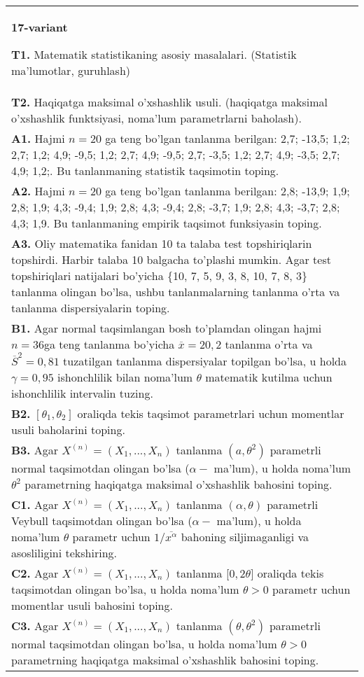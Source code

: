 \documentclass{article}
\begin{document}
\begin{tabular}{m{17cm}}
\textbf{17-variant}
\newline

\textbf{T1.} Matematik statistikaning asosiy masalalari. (Statistik ma'lumotlar, guruhlash)
\\
\textbf{T2.} 
Haqiqatga maksimal o'xshashlik usuli. (haqiqatga maksimal o'xshashlik funktsiyasi, noma'lum parametrlarni baholash).
\\
\textbf{A1.} 
Hajmi \(n = 20\) ga teng bo'lgan tanlanma berilgan: 2,7; -13,5; 1,2; 2,7; 1,2; 4,9; -9,5; 1,2; 2,7; 4,9; -9,5; 2,7; -3,5; 1,2; 2,7; 4,9; -3,5; 2,7; 4,9; 1,2;. Bu tanlanmaning statistik taqsimotin toping.
\\
\textbf{A2.} 
Hajmi \(n = 20\) ga teng bo'lgan tanlanma berilgan: 2,8; -13,9; 1,9; 2,8; 1,9; 4,3; -9,4; 1,9; 2,8; 4,3; -9,4; 2,8; -3,7; 1,9; 2,8; 4,3; -3,7; 2,8; 4,3; 1,9. Bu tanlanmaning empirik taqsimot funksiyasin toping.
\\
\textbf{A3.} 
Oliy matematika fanidan 10 ta talaba test topshiriqlarin topshirdi. Harbir talaba 10 balgacha to'plashi mumkin. Agar test topshiriqlari natijalari bo'yicha \{10, 7, 5, 9, 3, 8, 10, 7, 8, 3\} tanlanma olingan bo'lsa, ushbu tanlanmalarning tanlanma o'rta va tanlanma dispersiyalarin toping.
\\
\textbf{B1.} 
Agar normal taqsimlangan bosh to'plamdan olingan hajmi \(n = 36\)ga teng tanlanma bo'yicha \(\overline{x} = 20,2\) tanlanma o'rta va \({\overline{S}}^{2} = 0,81\) tuzatilgan tanlanma dispersiyalar topilgan bo'lsa, u holda \(\gamma = 0,95\) ishonchlilik bilan noma'lum \(\theta\) matematik kutilma uchun ishonchlilik intervalin tuzing.
\\
\textbf{B2.} 
\(\left\lbrack \theta_{1},\theta_{2} \right\rbrack\) oraliqda tekis taqsimot parametrlari uchun momentlar usuli baholarini toping.
\\
\textbf{B3.} 
Agar \(X^{(n)} = \left( X_{1},...,X_{n} \right)\) tanlanma \(\left( a,\theta^{2} \right)\) parametrli normal taqsimotdan olingan bo'lsa (\(\alpha -\) ma'lum), u holda noma'lum \(\theta^{2}\) parametrning haqiqatga maksimal o'xshashlik bahosini toping.
\\
\textbf{C1.} 
Agar \(X^{(n)} = \left( X_{1},...,X_{n} \right)\) tanlanma \((\alpha,\theta)\) parametrli Veybull taqsimotdan olingan bo'lsa (\(\alpha -\) ma'lum), u holda noma'lum \(\theta\) parametr uchun \(1/\overline{x^{\alpha}}\) bahoning siljimaganligi va asosliligini tekshiring.
\\
\textbf{C2.} 
Agar \(X^{(n)} = \left( X_{1},...,X_{n} \right)\) tanlanma {[}\(0,2\theta\rbrack\) oraliqda tekis taqsimotdan olingan bo'lsa, u holda noma'lum \(\theta > 0\) parametr uchun momentlar usuli bahosini toping.
\\
\textbf{C3.} 
Agar \(X^{(n)} = \left( X_{1},...,X_{n} \right)\) tanlanma \(\left( \theta,\theta^{2} \right)\) parametrli normal taqsimotdan olingan bo'lsa, u holda noma'lum \(\theta > 0\) parametrning haqiqatga maksimal o'xshashlik bahosini toping.
\\

\end{tabular}
\vspace{1cm}
\end{document}
